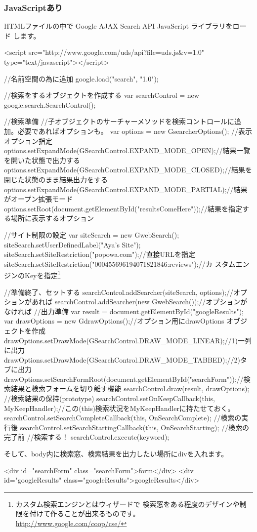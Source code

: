 \documentclass[mingoth,a4paper]{jsarticle}
\begin{document}
\subsubsection{JavaScriptあり}
HTMLファイルの中で Google AJAX Search API JavaScript ライブラリをロード
します。
\begin{commandline}
<script src="http://www.google.com/uds/api?file=uds.js&v=1.0" type="text/javascript"></script>
\end{commandline}
\begin{commandline}
//名前空間の為に追加
    google.load("search", "1.0"); 

//検索をするオブジェクトを作成する
    var searchControl = new google.search.SearchControl(); 

//検索準備
//子オブジェクトのサーチャーメソッドを検索コントロールに追加。必要であればオプションも。 
    var options = new GsearcherOptions(); //表示オプション指定
    options.setExpandMode(GSearchControl.EXPAND_MODE_OPEN);//結果一覧を開いた状態で出力する
    options.setExpandMode(GSearchControl.EXPAND_MODE_CLOSED);//結果を閉じた状態のまま結果出力をする
    options.setExpandMode(GSearchControl.EXPAND_MODE_PARTIAL);//結果がオープン拡張モード
    options.setRoot(document.getElementById("resultsComeHere"));//結果を指定する場所に表示するオプション

//サイト制限の設定
    var siteSearch = new GwebSearch();
    siteSearch.setUserDefinedLabel("Aya's Site");
    siteSearch.setSiteRestriction("popowa.com");//直接URLを指定
    siteSearch.setSiteRestriction("000455696194071821846:reviews");//カ
 スタムエンジンのKeyを指定\footnote{カスタム検索エンジンとはウィザードで
 検索窓をある程度のデザインや制限を付けて作ることが出来るものです。\\
\url{http://www.google.com/coop/cse/}}

//準備終了、セットする
    searchControl.addSearcher(siteSearch, options);//オプションがあれば
    searchControl.addSearcher(new GwebSearch());//オプションがなければ
//出力準備
    var result = document.getElementById("googleResults");
    var drawOptions = new GdrawOptions();//オプション用にdrawOptions オブジェクトを作成
    drawOptions.setDrawMode(GSearchControl.DRAW_MODE_LINEAR);//1)一列に出力
    drawOptions.setDrawMode(GSearchControl.DRAW_MODE_TABBED);//2)タブに出力
    drawOptions.setSearchFormRoot(document.getElementById("searchForm"));//検索結果と検索フォームを切り離す機能
    searchControl.draw(result, drawOptions);
//検索結果の保持(prototype)
    searchControl.setOnKeepCallback(this, MyKeepHandler);//この(this)検索状況をMyKeepHandlerに持たせておく。
    searchControl.setSearchCompleteCallback(this, OnSearchComplete); //検索の実行後
    searchControl.setSearchStartingCallback(this, OnSearchStarting); //検索の完了前
//検索する！
    searchControl.execute(keyword);
\end{commandline}
そして、body内に検索窓、検索結果を出力したい場所にdivを入れます。
\begin{commandline}
 <div id="searchForm" class="searchForm">form</div>
 <div id="googleResults" class="googleResults">googleResults</div>
\end{commandline}
\end{document}
